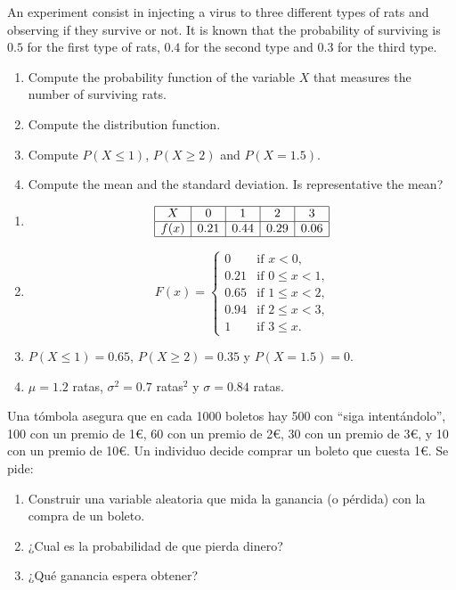 {An experiment consist in injecting a virus to three different types of rats and observing if they survive or not. 
It is known that the probability of surviving is $0.5$ for the first type of rats, $0.4$ for the second type and $0.3$
for the third type.
\begin{enumerate}
\item Compute the probability function of the variable $X$ that measures the number of surviving rats.
\item Compute the distribution function.
\item Compute $P(X\leq 1)$, $P(X\geq 2)$ and $P(X=1.5)$.
\item Compute the mean and the standard deviation. 
Is representative the mean?
\end{enumerate}
}
{
\begin{enumerate}
\item \[
\begin{array}{|c|c|c|c|c|}
\hline
X & 0 & 1 & 2 & 3 \\
\hline
f(x) & 0.21 & 0.44 & 0.29 & 0.06\\
\hline
\end{array}
\]
\item \[
F(x)=
\begin{cases}
0 & \text{if $x<0$,}\\
0.21 & \text{if $0\leq x<1$,}\\
0.65 & \text{if $1\leq x<2$,}\\
0.94 & \text{if $2\leq x<3$,}\\
1 & \text{if $3\leq x$.}
\end{cases}
\]
\item $P(X\leq 1)=0.65$, $P(X\geq 2)=0.35$ y $P(X=1.5)=0$.
\item $\mu=1.2$ ratas, $\sigma^2=0.7$ ratas$^2$ y $\sigma=0.84$ ratas.
\end{enumerate}
}
{}


{Una tómbola asegura que en cada 1000 boletos hay 500 con ``siga intentándolo'', 100 con un premio de 1\euro, 60 con un premio de 2\euro, 30 con un premio de 3\euro, y 10 con un premio de 10\euro. Un individuo decide comprar un boleto que cuesta 1\euro. Se pide:

\begin{enumerate}
\item Construir una variable aleatoria que mida la ganancia (o pérdida) con la compra de un boleto.
\item ¿Cual es la probabilidad de que pierda dinero?
\item ¿Qué ganancia espera obtener?
\end{enumerate}
}
{}
{}


